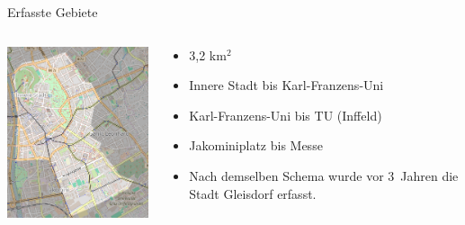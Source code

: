 \documentclass{beamer}
\begin{document}
\begin{frame}{Erfasste Gebiete}

  \begin{columns}[c]
    \begin{column}[T]{.6\textwidth}
      \begin{center}
      \vspace{-1cm}
      \includegraphics[width=6cm]{gebiet.png}
      \end{center}
    \end{column}
    \begin{column}[T]{.4\textwidth}
      \begin{itemize}
            \item 3,2 km$^2$
            \item Innere Stadt bis Karl-Franzens-Uni
    \item       Karl-Franzens-Uni bis TU (Inffeld)
  \item       Jakominiplatz bis Messe
      \vspace{1cm}
  \item       Nach demselben Schema wurde vor 3~Jahren die Stadt Gleisdorf erfasst.
    \end{itemize}
    \end{column}
  \end{columns}

\end{frame}
\end{document}
